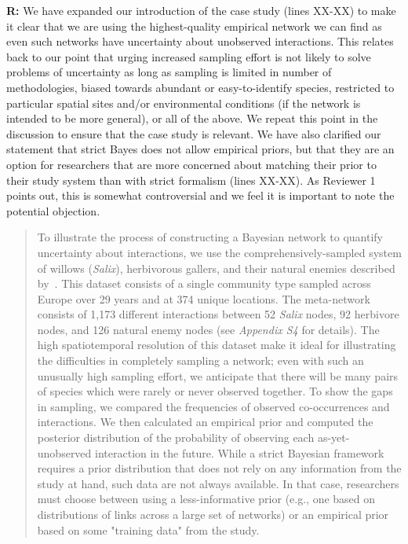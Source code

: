 \documentclass[12pt]{letter}
\begin{document}
		\textbf{R:} We have expanded our introduction of the case study (lines XX-XX) to make it clear that we are using the highest-quality empirical network we can find as even such networks have uncertainty about unobserved interactions. This relates back to our point that urging increased sampling effort is not likely to solve problems of uncertainty as long as sampling is limited in number of methodologies, biased towards abundant or easy-to-identify species, restricted to particular spatial sites and/or environmental conditions (if the network is intended to be more general), or all of the above. We repeat this point in the discussion to ensure that the case study is relevant. We have also clarified our statement that strict Bayes does not allow empirical priors, but that they are an option for researchers that are more concerned about matching their prior to their study system than with strict formalism (lines XX-XX). As Reviewer 1 points out, this is somewhat controversial and we feel it is important to note the potential objection.

		\begin{quotation}

 			To illustrate the process of constructing a Bayesian network to quantify uncertainty about interactions, we use the comprehensively-sampled system of willows (\emph{Salix}), herbivorous gallers, and their natural enemies described by~\citet{Kopelke2017}. This dataset consists of a single community type sampled across Europe over 29 years and at 374 unique locations. The meta-network consists of 1,173 different interactions between 52 \emph{Salix} nodes, 92 herbivore nodes, and 126 natural enemy nodes (see \emph{Appendix S4} for details). 
      The high spatiotemporal resolution of this dataset make it ideal for illustrating the difficulties in completely sampling a network; even with such an unusually high sampling effort, we anticipate that there will be many pairs of species which were rarely or never observed together. To show the gaps in sampling, we compared the frequencies of observed co-occurrences and interactions. We then calculated an empirical prior and computed the posterior distribution of the probability of observing each as-yet-unobserved interaction in the future.
      \medskip
			While a strict Bayesian framework requires a prior distribution that does not rely on any information from the study at hand, such data are not always available. In that case, researchers must choose between using a less-informative prior (e.g., one based on distributions of links across a large set of networks) or an empirical prior based on some "training data" from the study. 
		\end{quotation}
\end{document}
